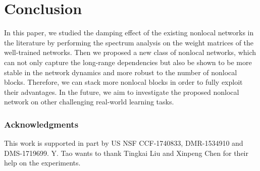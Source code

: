 \documentclass{article}
\begin{document}
\section{Conclusion}\label{sec:con}
In this paper, we studied the damping effect of the existing nonlocal networks in the literature by performing the spectrum analysis on the weight matrices of the well-trained networks. Then we proposed a new class of nonlocal networks, which can not only capture the long-range dependencies but also be shown to be more stable in the network dynamics and more robust to the number of nonlocal blocks. Therefore, we can stack more nonlocal blocks in order to fully exploit their advantages. In the future, we aim to investigate the proposed nonlocal network on other challenging real-world learning tasks.


\subsubsection*{Acknowledgments}
This work is supported in part by US NSF CCF-1740833, DMR-1534910 and DMS-1719699. Y. Tao wants to thank Tingkai Liu and Xinpeng Chen for their help on the experiments.

\begin{small}


\end{small}

\appendix
\end{document}
